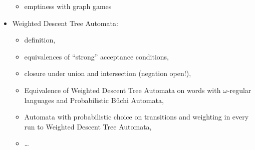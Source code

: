 \documentclass{scrartcl}
\begin{document}
\begin{itemize}
\begin{itemize}
      \item emptiness with graph games
    \end{itemize}
  \item Weighted Descent Tree Automata:
    \begin{itemize} 
      \item definition,
      \item equivalences of \enquote{strong} acceptance conditions, 
      \item closure under union and intersection (negation open!), 
      \item Equivalence of Weighted Descent Tree Automata on words with 
        $\omega$-regular languages and Probabilistic Büchi Automata,
      \item Automata with probabilistic choice on transitions and weighting in
        every run to Weighted Descent Tree Automata,
      \item \dots
    \end{itemize}
\end{itemize}
\end{document}
